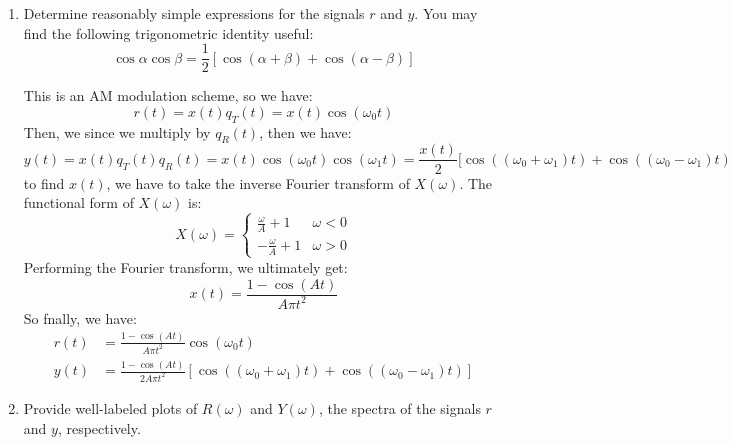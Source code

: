 \documentclass[10pt]{article}
\begin{document}
	\begin{enumerate}[label=\alph*)]
		\item Determine reasonably simple expressions for the signals \( r \) and \( y \). You may find the following 
			trigonometric identity useful:
			\[
				\cos \alpha \cos \beta = \frac{1}{2}[\cos(\alpha + \beta) + \cos(\alpha - \beta)]
			\] 

			\begin{solution}
				This is an AM modulation scheme, so we have:
				\[
				r(t) = x(t) q_T(t) = x(t) \cos(\omega_0 t)
				\] 
				Then, we since we multiply by \( q_R(t) \), then we have:
				\[
				y(t) = x(t) q_T(t) q_R(t) = x(t) \cos(\omega_0 t) \cos(\omega_1 t)
				= \frac{x(t)}{2}[\cos((\omega_0 + \omega_1)t) + \cos((\omega_0 - \omega_1) t) 
				\] 
				to find \( x(t) \), we have to take the inverse Fourier transform of \( X(\omega) \). The functional 
				form of \( X(\omega) \) is:
				\[
				X(\omega) = \begin{cases}
					\frac{\omega}{A} + 1 & \omega < 0\\
					-\frac{\omega}{A} + 1 & \omega > 0
				\end{cases}
				\] 
				Performing the Fourier transform, we ultimately get:
				\[
				x(t) = \frac{1 - \cos(At)}{A \pi t^2}
				\] 
				So fnally, we have:
				\begin{align*}
					r(t) &= \frac{1 - \cos(At)}{A \pi t^2} \cos (\omega_0 t)\\
					y(t) &= 
					\frac{1 - \cos(At)}{2 A \pi t^2}[\cos((\omega_0 + \omega_1)t) + \cos((\omega_0 - \omega_1)t) ]
				\end{align*}
			\end{solution}
		\item Provide well-labeled plots of \( R(\omega)  \) and \( Y(\omega) \), the spectra of the signals \( r \) 
			and \( y \), respectively.


\end{enumerate}
\end{document}
